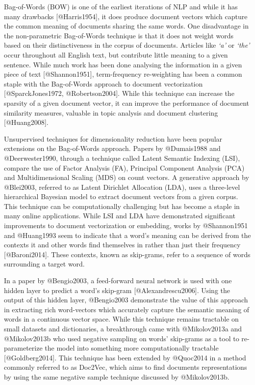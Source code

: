 \documentclass[11pt]{article}
\begin{document}
Bag-of-Words (BOW) is one of the earliest iterations of NLP and while it
has many drawbacks {[}@Harris1954{]}, it does produce document vectors
which capture the common meaning of documents sharing the same words.
One disadvantage in the non-parametric Bag-of-Words technique is that it
does not weight words based on their distinctiveness in the corpus of
documents. Articles like \emph{`a'} or \emph{`the'} occur throughout all
English text, but contribute little meaning to a given sentence. While
much work has been done analysing the information in a given piece of
text {[}@Shannon1951{]}, term-frequency re-weighting has been a common
staple with the Bag-of-Words approach to document vectorization
{[}@SparckJones1972, @Robertson2004{]}. While this technique can
increase the sparsity of a given document vector, it can improve the
performance of document similarity measures, valuable in topic analysis
and document clustering {[}@Huang2008{]}.

Unsupervised techniques for dimensionality reduction have been popular
extensions on the Bag-of-Words approach. Papers by @Dumais1988 and
@Deerwester1990, through a technique called Latent Semantic Indexing
(LSI), compare the use of Factor Analysis (FA), Principal Component
Analysis (PCA) and Multidimensional Scaling (MDS) on count vectors. A
generative approach by @Blei2003, referred to as Latent Dirichlet
Allocation (LDA), uses a three-level hierarchical Bayesian model to
extract document vectors from a given corpus. This technique can be
computationally challenging but has become a staple in many online
applications. While LSI and LDA have demonstrated significant
improvements to document vectorization or embedding, works by
@Shannon1951 and @Huang1993 seem to indicate that a word's meaning can
be derived from the contexts it and other words find themselves in
rather than just their frequency {[}@Baroni2014{]}. These contexts,
known as skip-grams, refer to a sequence of words surrounding a target
word.

In a paper by @Bengio2003, a feed-forward neural network is used with
one hidden layer to predict a word's skip-gram {[}@Alexandrescu2006{]}.
Using the output of this hidden layer, @Bengio2003 demonstrate the value
of this approach in extracting rich word-vectors which accurately
capture the semantic meaning of words in a continuous vector space.
While this technique remains tractable on small datasets and
dictionaries, a breakthrough came with @Mikolov2013a and @Mikolov2013b
who used negative sampling on words' skip-grams as a tool to
re-parameterize the model into something more computationally tractable
{[}@Goldberg2014{]}. This technique has been extended by @Quoc2014 in a
method commonly referred to as Doc2Vec, which aims to find documents
representations by using the same negative sample technique discussed by
@Mikolov2013b.
\end{document}
